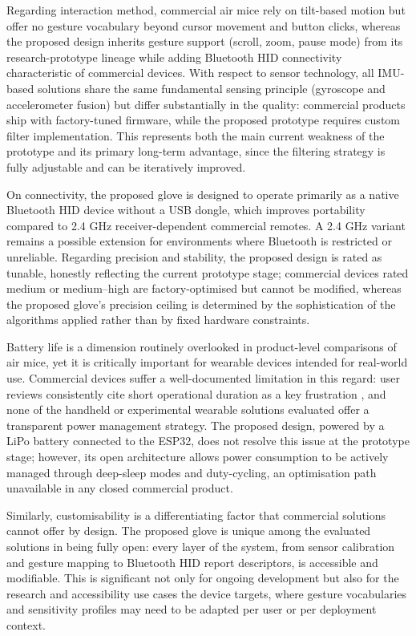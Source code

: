 Regarding interaction method, commercial air mice rely on tilt-based motion but offer no gesture vocabulary beyond cursor movement and button clicks, whereas the proposed design inherits gesture support (scroll, zoom, pause mode) from its research-prototype lineage \cite{cornell_airmouse_project,acm_airmouse_interface} while adding Bluetooth HID connectivity characteristic of commercial devices. With respect to sensor technology, all IMU-based solutions share the same fundamental sensing principle (gyroscope and accelerometer fusion) but differ substantially in the quality: commercial products ship with factory-tuned firmware, while the proposed prototype requires custom filter implementation. This represents both the main current weakness of the prototype and its primary long-term advantage, since the filtering strategy is fully adjustable and can be iteratively improved.

On connectivity, the proposed glove is designed to operate primarily as a native Bluetooth HID device without a USB dongle, which improves portability compared to 2.4 GHz receiver-dependent commercial remotes. A 2.4 GHz variant remains a possible extension for environments where Bluetooth is restricted or unreliable. Regarding precision and stability, the proposed design is rated as tunable, honestly reflecting the current prototype stage; commercial devices rated medium or medium--high are factory-optimised but cannot be modified, whereas the proposed glove's precision ceiling is determined by the sophistication of the algorithms applied rather than by fixed hardware constraints. 

Battery life is a dimension routinely overlooked in product-level comparisons of air mice, yet it is critically important for wearable devices intended for real-world use. Commercial devices suffer a well-documented limitation in this regard: user reviews consistently cite short operational duration as a key frustration \cite{reddit_airmouse_discussion}, and none of the handheld or experimental wearable solutions evaluated offer a transparent power management strategy. The proposed design, powered by a LiPo battery connected to the ESP32, does not resolve this issue at the prototype stage; however, its open architecture allows power consumption to be actively managed through deep-sleep modes and duty-cycling, an optimisation path unavailable in any closed commercial product.

Similarly, customisability is a differentiating factor that commercial solutions cannot offer by design. The proposed glove is unique among the evaluated solutions in being fully open: every layer of the system, from sensor calibration and gesture mapping to Bluetooth HID report descriptors, is accessible and modifiable. This is significant not only for ongoing development but also for the research and accessibility use cases the device targets, where gesture vocabularies and sensitivity profiles may need to be adapted per user or per deployment context.

